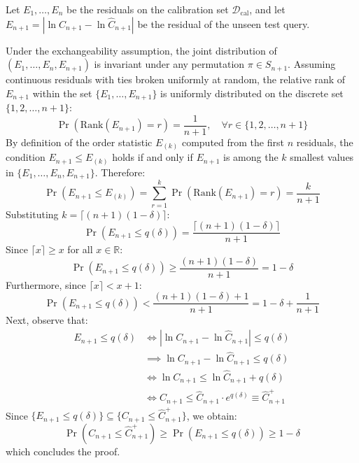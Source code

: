 \documentclass[11pt,a4paper]{article}
\begin{document}
\begin{proofbox}
Let $E_1, \dots, E_n$ be the residuals on the calibration set $\mathcal{D}_{\text{cal}}$, and let $E_{n+1} = |\ln C_{n+1} - \ln \hat{C}_{n+1}|$ be the residual of the unseen test query.

Under the exchangeability assumption, the joint distribution of $(E_1, \dots, E_n, E_{n+1})$ is invariant under any permutation $\pi \in S_{n+1}$. Assuming continuous residuals with ties broken uniformly at random, the relative rank of $E_{n+1}$ within the set $\{E_1, \dots, E_{n+1}\}$ is uniformly distributed on the discrete set $\{1, 2, \dots, n+1\}$:
\begin{equation}
    \Pr\left( \text{Rank}(E_{n+1}) = r \right) = \frac{1}{n+1}, \quad \forall r \in \{1, 2, \dots, n+1\}
\end{equation}
By definition of the order statistic $E_{(k)}$ computed from the first $n$ residuals, the condition $E_{n+1} \le E_{(k)}$ holds if and only if $E_{n+1}$ is among the $k$ smallest values in $\{E_1, \dots, E_n, E_{n+1}\}$. Therefore:
\begin{equation}
    \Pr\left( E_{n+1} \le E_{(k)} \right) = \sum_{r=1}^k \Pr\left( \text{Rank}(E_{n+1}) = r \right) = \frac{k}{n+1}
\end{equation}
Substituting $k = \lceil(n+1)(1-\delta)\rceil$:
\begin{equation}
    \Pr\left( E_{n+1} \le q(\delta) \right) = \frac{\lceil(n+1)(1-\delta)\rceil}{n+1}
\end{equation}
Since $\lceil x \rceil \ge x$ for all $x \in \mathbb{R}$:
\begin{equation}
    \Pr\left( E_{n+1} \le q(\delta) \right) \ge \frac{(n+1)(1-\delta)}{n+1} = 1 - \delta
\end{equation}
Furthermore, since $\lceil x \rceil < x + 1$:
\begin{equation}
    \Pr\left( E_{n+1} \le q(\delta) \right) < \frac{(n+1)(1-\delta) + 1}{n+1} = 1 - \delta + \frac{1}{n+1}
\end{equation}
Next, observe that:
\begin{align*}
    E_{n+1} \le q(\delta)
    &\iff |\ln C_{n+1} - \ln \hat{C}_{n+1}| \le q(\delta) \\
    &\implies \ln C_{n+1} - \ln \hat{C}_{n+1} \le q(\delta) \\
    &\iff \ln C_{n+1} \le \ln \hat{C}_{n+1} + q(\delta) \\
    &\iff C_{n+1} \le \hat{C}_{n+1} \cdot e^{q(\delta)} \equiv \hat{C}_{n+1}^+
\end{align*}
Since $\{E_{n+1} \le q(\delta)\} \subseteq \{C_{n+1} \le \hat{C}_{n+1}^+\}$, we obtain:
\begin{equation}
    \Pr\left( C_{n+1} \le \hat{C}_{n+1}^+ \right) \ge \Pr\left( E_{n+1} \le q(\delta) \right) \ge 1 - \delta
\end{equation}
which concludes the proof.
\end{proofbox}
\end{document}
